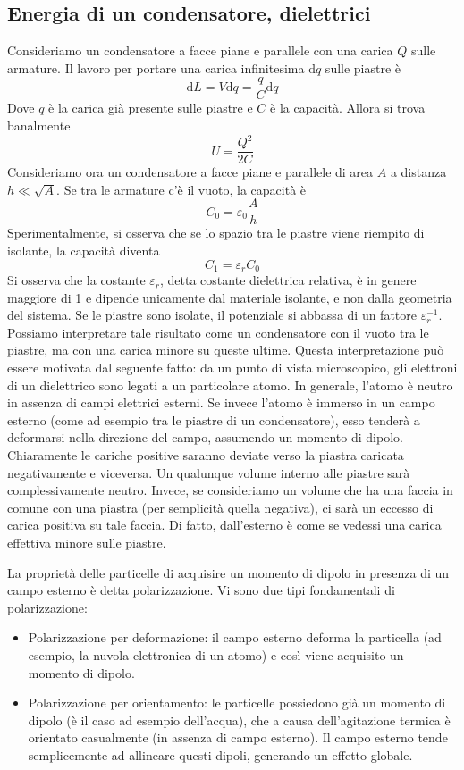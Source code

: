 \documentclass[a4paper,11pt]{book}
\newcommand{\dif}{\mathrm{d}}
\let\oldepsilon\epsilon
\let\oldvarepsilon\varepsilon
\renewcommand{\epsilon}{\oldvarepsilon}
\renewcommand{\varepsilon}{\oldepsilon}
\theoremstyle{definition}
\theoremstyle{theorem}
\begin{document}
\subsection{Energia di un condensatore, dielettrici}
Consideriamo un condensatore a facce piane e parallele con una carica $Q$ sulle armature. Il lavoro per portare una carica infinitesima $\dif q$ sulle piastre è
\[\dif L=V\dif q=\frac{q}{C}\dif q\]
Dove $q$ è la carica già presente sulle piastre e $C$ è la capacità. Allora si trova banalmente
\[U=\frac{Q^2}{2C}\]
Consideriamo ora un condensatore a facce piane e parallele di area $A$ a distanza $h\ll\sqrt{A}$. Se tra le armature c'è il vuoto, la capacità è
\[C_0=\epsilon_0\frac{A}{h}\]
Sperimentalmente, si osserva che se lo spazio tra le piastre viene riempito di isolante, la capacità diventa
\[C_1=\epsilon_rC_0\]
Si osserva che la costante $\epsilon_r$, detta costante dielettrica relativa, è in genere maggiore di 1 e dipende unicamente dal materiale isolante, e non dalla geometria del sistema. Se le piastre sono isolate, il potenziale si abbassa di un fattore $\epsilon_r^{-1}$. Possiamo interpretare tale risultato come un condensatore con il vuoto tra le piastre, ma con una carica minore su queste ultime. Questa interpretazione può essere motivata dal seguente fatto: da un punto di vista microscopico, gli elettroni di un dielettrico sono legati a un particolare atomo. In generale, l'atomo è neutro in assenza di campi elettrici esterni. Se invece l'atomo è immerso in un campo esterno (come ad esempio tra le piastre di un condensatore), esso tenderà a deformarsi nella direzione del campo, assumendo un momento di dipolo. Chiaramente le cariche positive saranno deviate verso la piastra caricata negativamente e viceversa. Un qualunque volume interno alle piastre sarà complessivamente neutro. Invece, se consideriamo un volume che ha una faccia in comune con una piastra (per semplicità quella negativa), ci sarà un eccesso di carica positiva su tale faccia. Di fatto, dall'esterno è come se vedessi una carica effettiva minore sulle piastre.

La proprietà delle particelle di acquisire un momento di dipolo in presenza di un campo esterno è detta polarizzazione. Vi sono due tipi fondamentali di polarizzazione:
\begin{itemize}
	\item Polarizzazione per deformazione: il campo esterno deforma la particella (ad esempio, la nuvola elettronica di un atomo) e così viene acquisito un momento di dipolo.
	\item Polarizzazione per orientamento: le particelle possiedono già un momento di dipolo (è il caso ad esempio dell'acqua), che a causa dell'agitazione termica è orientato casualmente (in assenza di campo esterno). Il campo esterno tende semplicemente ad allineare questi dipoli, generando un effetto globale.	
\end{itemize}
\end{document}
